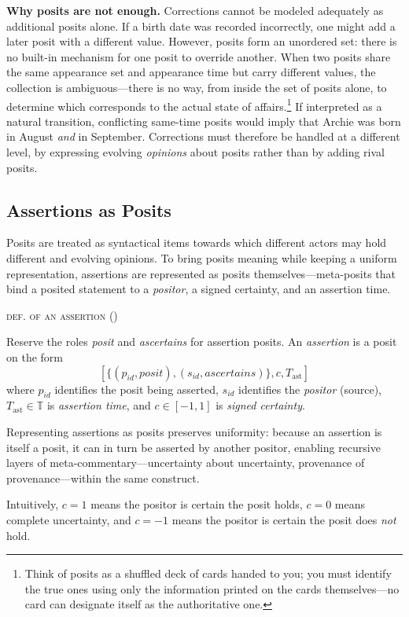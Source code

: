 \documentclass[a4paper,fleqn]{cas-sc}
\newcounter{majorcount}
\newcommand{\deffy}[3]{
	\vspace{2ex}
	\refstepcounter{majorcount}
	\noindent\textsc{#1} {\normalfont(\arabic{majorcount})}
	\\\begin{small}
	\noindent #2%
	\label{Def:#3}
	\end{small}
	\vspace{2ex}
}
\begin{document}
\textbf{Why posits are not enough.} Corrections cannot be modeled adequately as additional posits alone. If a birth date was recorded incorrectly, one might add a later posit with a different value. However, posits form an unordered set: there is no built-in mechanism for one posit to override another. When two posits share the same appearance set and appearance time but carry different values, the collection is ambiguous---there is no way, from inside the set of posits alone, to determine which corresponds to the actual state of affairs.\footnote{Think of posits as a shuffled deck of cards handed to you; you must identify the true ones using only the information printed on the cards themselves---no card can designate itself as the authoritative one.} If interpreted as a natural transition, conflicting same-time posits would imply that Archie was born in August \emph{and} in September. Corrections must therefore be handled at a different level, by expressing evolving \emph{opinions} about posits rather than by adding rival posits.

\subsection{Assertions as Posits}
Posits are treated as syntactical items towards which different actors may hold different and evolving opinions. To bring posits meaning while keeping a uniform representation, assertions are represented as posits themselves---meta-posits that bind a posited statement to a \emph{positor}, a signed certainty, and an assertion time.

\deffy{def. of an assertion}{%
Reserve the roles \textit{posit} and \textit{ascertains} for assertion posits. An \emph{assertion} is a posit on the form
$$\left[\{(p_{id}, \textit{posit}), (s_{id}, \textit{ascertains})\}, c, T_{\mathrm{ast}}\right]$$
where \(p_{id}\) identifies the posit being asserted, \(s_{id}\) identifies the \emph{positor} (source), \(T_{\mathrm{ast}}\in\mathbb{T}\) is \emph{assertion time}, and \(c\in[-1,1]\) is \emph{signed certainty}.}{assertion}

Representing assertions as posits preserves uniformity: because an assertion is itself a posit, it can in turn be asserted by another positor, enabling recursive layers of meta-commentary---uncertainty about uncertainty, provenance of provenance---within the same construct.

Intuitively, \(c=1\) means the positor is certain the posit holds, \(c=0\) means complete uncertainty, and \(c=-1\) means the positor is certain the posit does \emph{not} hold.
\end{document}
